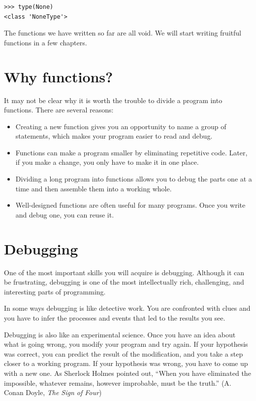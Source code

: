 \documentclass[10pt]{book}
\begin{document}
\begin{verbatim}
>>> type(None)
<class 'NoneType'>
\end{verbatim}
%
The functions we have written so far are all void.  We will start
writing fruitful functions in a few chapters.


\section{Why functions?}

It may not be clear why it is worth the trouble to divide
a program into functions.  There are several reasons:

\begin{itemize}

\item Creating a new function gives you an opportunity to name a group
of statements, which makes your program easier to read and debug.

\item Functions can make a program smaller by eliminating repetitive
code.  Later, if you make a change, you only have
to make it in one place.

\item Dividing a long program into functions allows you to debug the
parts one at a time and then assemble them into a working whole.

\item Well-designed functions are often useful for many programs.
Once you write and debug one, you can reuse it.

\end{itemize}


\section{Debugging}

One of the most important skills you will acquire is debugging.
Although it can be frustrating, debugging is one of the most
intellectually rich, challenging, and interesting parts of
programming.

In some ways debugging is like detective work.  You are confronted
with clues and you have to infer the processes and events that led
to the results you see.

Debugging is also like an experimental science.  Once you have an idea
about what is going wrong, you modify your program and try again.  If
your hypothesis was correct, you can predict the result of the
modification, and you take a step closer to a working program.  If
your hypothesis was wrong, you have to come up with a new one.  As
Sherlock Holmes pointed out, ``When you have eliminated the
impossible, whatever remains, however improbable, must be the truth.''
(A. Conan Doyle, {\em The Sign of Four})
\end{document}
